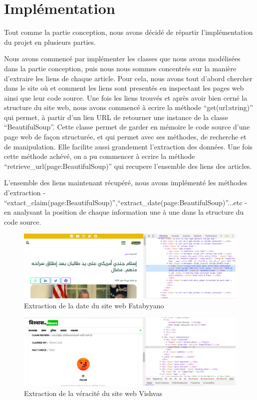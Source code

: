 \documentclass[oneside,13pt,a4paper]{report}
\begin{document}
\section{Implémentation}

Tout comme la partie conception, nous avons décidé de répartir l'implémentation du projet en plusieurs parties.

Nous avons commencé par implémenter les classes que nous avons modélisées dans la partie conception, puis nous nous sommes concentrés sur la manière d'extraire les liens de chaque article. Pour cela, nous avons tout d'abord chercher dans le site où et comment les liens sont presentés en inspectant les pages web ainsi que leur code source. Une fois les liens trouvés et après avoir bien cerné la structure du site web, nous avons commencé à ecrire la méthode \enquote{get(url:string)} qui permet, à partir d'un lien URL de retourner une instance de la classe \enquote{BeautifulSoup}. Cette classe permet de garder en mémoire le code source d'une page web de façon structurée, et qui permet avec ses méthodes, de recherche et de manipulation. Elle facilite aussi grandement l'extraction des données. Une fois cette méthode achévé, on a pu commencer à ecrire la méthode \enquote{retrieve\_url(page:BeautifulSoup)} qui recupere l'ensemble des liens des articles.

L'ensemble des liens maintenant récupéré, nous avons implémenté les méthodes d'extraction - \enquote{extact\_claim(page:BeautifulSoup)},\enquote{extract\_date(page:BeautifulSoup)}...etc - en analysant la position de chaque information une à une dans la structure du code source.


\begin{figure}[h]
	\centering
	\begin{minipage}[c]{.95\linewidth}
		\includegraphics[width=1\textwidth]{img/fatab-screen.png}
		\caption{Extraction de la date du site web Fatabyyano}
	\end{minipage}
\end{figure}
\begin{figure}[h]
	\centering
	\begin{minipage}[c]{.95\linewidth}
		\includegraphics[width=1\textwidth]{img/vishvas-screen.png}
		\caption{Extraction de la véracité du site web Vishvas}
	\end{minipage}
\end{figure}
\end{document}
